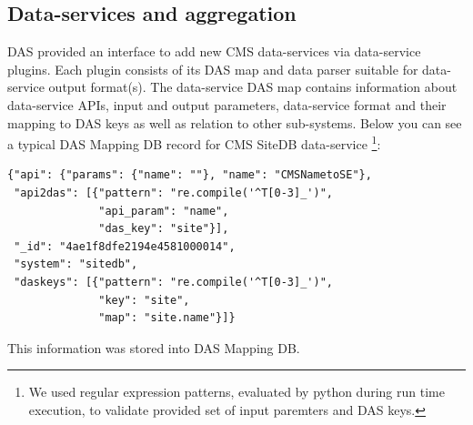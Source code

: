 \documentclass[a4paper]{jpconf}
\begin{document}
\subsection{Data-services and aggregation}
DAS provided an interface to add new CMS data-services via data-service plugins.
Each plugin consists of its DAS map and data parser suitable for data-service output
format(s).
The data-service DAS map contains information about data-service APIs,
input and output parameters, data-service
format and their mapping to DAS keys as well as relation to other sub-systems. 
Below you can see a typical DAS Mapping DB record for CMS
SiteDB data-service \cite{SiteDB}\footnote{We used regular expression 
patterns, evaluated by python during run time
execution, to validate provided set of input paremters and DAS keys.}:
\begin{verbatim}
{"api": {"params": {"name": ""}, "name": "CMSNametoSE"}, 
 "api2das": [{"pattern": "re.compile('^T[0-3]_')", 
              "api_param": "name", 
              "das_key": "site"}], 
 "_id": "4ae1f8dfe2194e4581000014", 
 "system": "sitedb", 
 "daskeys": [{"pattern": "re.compile('^T[0-3]_')", 
              "key": "site", 
              "map": "site.name"}]}
\end{verbatim}
This information was stored into DAS Mapping DB. 
\end{document}
